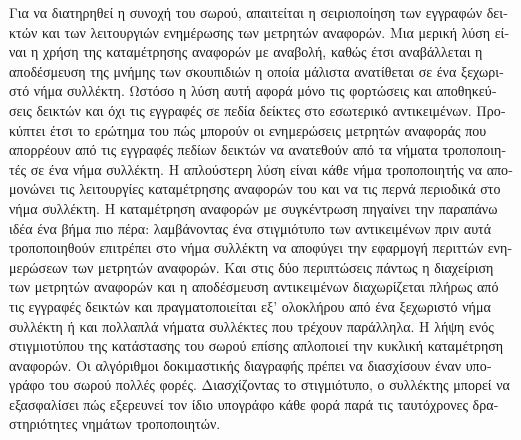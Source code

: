 \begin{greek}
Για να διατηρηθεί η συνοχή του σωρού, απαιτείται η σειριοποίηση
των εγγραφών δεικτών και των λειτουργιών ενημέρωσης των μετρητών
αναφορών. Μια μερική λύση είναι η χρήση της καταμέτρησης αναφορών
με αναβολή, καθώς έτσι αναβάλλεται η αποδέσμευση της μνήμης των 
σκουπιδιών η οποία μάλιστα ανατίθεται σε ένα ξεχωριστό νήμα
συλλέκτη. Ωστόσο η λύση αυτή αφορά μόνο τις φορτώσεις και
αποθηκεύσεις δεικτών και όχι τις εγγραφές σε πεδία δείκτες στο
εσωτερικό αντικειμένων. Προκύπτει έτσι το ερώτημα του πώς μπορούν
οι ενημερώσεις μετρητών αναφοράς που απορρέουν από τις εγγραφές
πεδίων δεικτών να ανατεθούν από τα νήματα τροποποιητές σε ένα
νήμα συλλέκτη. Η απλούστερη λύση είναι κάθε νήμα τροποποιητής
να απομονώνει τις λειτουργίες καταμέτρησης αναφορών του και να
τις περνά περιοδικά στο νήμα συλλέκτη. Η καταμέτρηση αναφορών
με συγκέντρωση πηγαίνει την παραπάνω ιδέα ένα βήμα πιο πέρα:
λαμβάνοντας ένα στιγμιότυπο των αντικειμένων πριν αυτά τροποποιηθούν
επιτρέπει στο νήμα συλλέκτη να αποφύγει την εφαρμογή περιττών
ενημερώσεων των μετρητών αναφορών. Και στις δύο περιπτώσεις
πάντως η διαχείριση των μετρητών αναφορών και η αποδέσμευση
αντικειμένων διαχωρίζεται πλήρως από τις εγγραφές δεικτών
και πραγματοποιείται εξ' ολοκλήρου από ένα ξεχωριστό νήμα
συλλέκτη ή και πολλαπλά νήματα συλλέκτες που τρέχουν παράλληλα.
Η λήψη ενός στιγμιοτύπου της κατάστασης του σωρού επίσης
απλοποιεί την κυκλική καταμέτρηση αναφορών. Οι αλγόριθμοι
δοκιμαστικής διαγραφής πρέπει να διασχίσουν έναν υπογράφο του
σωρού πολλές φορές. Διασχίζοντας το στιγμιότυπο, ο συλλέκτης
μπορεί να εξασφαλίσει πώς εξερευνεί τον ίδιο υπογράφο κάθε
φορά παρά τις ταυτόχρονες δραστηριότητες νημάτων τροποποιητών.

\end{greek}
